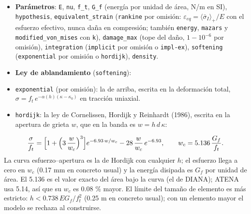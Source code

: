 \documentclass[11pt,oneside]{report}
\begin{document}
\begin{itemize}
  \item \textbf{Parámetros}: \texttt{E}, \texttt{nu}, \texttt{f\_t}, \texttt{G\_f} (energía por unidad de área, N/m en SI), \texttt{hypothesis}, \texttt{equivalent\_\allowbreak{}strain} (\texttt{rankine} por omisión: $\varepsilon_{eq} = \langle\bar\sigma_I\rangle_+/E$ con el esfuerzo efectivo, nunca daña en compresión; también \texttt{energy}, \texttt{mazars} y \texttt{modified\_\allowbreak{}von\_\allowbreak{}mises} con \texttt{k}), \texttt{damage\_max} (tope del daño, $1 - 10^{-6}$ por omisión), \texttt{integration} (\texttt{implicit} por omisión o \texttt{impl-ex}), \texttt{softening} (\texttt{exponential} por omisión o \texttt{hordijk}), \texttt{density}.
  \item \textbf{Ley de ablandamiento} (\texttt{softening}):
  \item \texttt{exponential} (por omisión): la de arriba, escrita en la deformación total, $\sigma = f_t\,e^{-\alpha(h)(\kappa-\kappa_0)}$ en tracción uniaxial.
  \item \texttt{hordijk}: la ley de Cornelissen, Hordijk y Reinhardt (1986), escrita en la apertura de grieta $w$, que en la banda es $w = h\,d\,\kappa$:
\end{itemize}
    \[
\frac{\sigma}{f_t} = \Bigl[1 + \Bigl(3\,\frac{w}{w_c}\Bigr)^3\Bigr]e^{-6.93\,w/w_c} - 28\,\frac{w}{w_c}\,e^{-6.93}, \qquad w_c = 5.136\,\frac{G_f}{f_t}.
\]
    La curva esfuerzo--apertura es la de Hordijk con cualquier $h$; el esfuerzo llega a cero en $w_c$ (0.17 mm en concreto usual) y la energía disipada es $G_f$ por unidad de área. El 5.136 es el valor exacto del área bajo la curva (el de DIANA); ATENA usa 5.14, así que su $w_c$ es 0.08 \% mayor. El límite del tamaño de elemento es más estricto: $h < 0.738\,EG_f/f_t^2$ (0.25 m en concreto usual); con un elemento mayor el modelo se rechaza al construirse.
\end{document}

